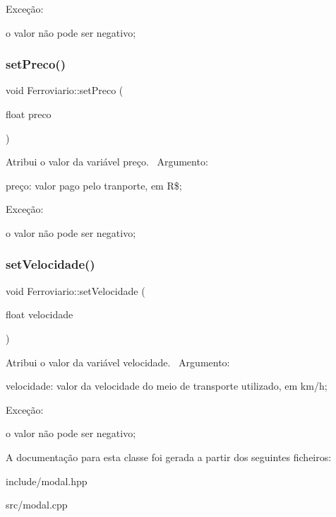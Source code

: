 Exceção\+:
\begin{DoxyItemize}
\item o valor não pode ser negativo;
\end{DoxyItemize}\mbox{\label{classFerroviario_a51c231a25084ce9bef1648642196b94e}} 
\subsubsection{\texorpdfstring{set\+Preco()}{setPreco()}}
{\footnotesize\ttfamily void Ferroviario\+::set\+Preco (\begin{DoxyParamCaption}\item[{float}]{preco }\end{DoxyParamCaption})}

Atribui o valor da variável preço.~\newline
 Argumento\+:
\begin{DoxyItemize}
\item preço\+: valor pago pelo tranporte, em R\$;
\end{DoxyItemize}

Exceção\+:
\begin{DoxyItemize}
\item o valor não pode ser negativo;
\end{DoxyItemize}\mbox{\label{classFerroviario_a773bb8838b8e651c5a59a196fd3df6be}} 
\subsubsection{\texorpdfstring{set\+Velocidade()}{setVelocidade()}}
{\footnotesize\ttfamily void Ferroviario\+::set\+Velocidade (\begin{DoxyParamCaption}\item[{float}]{velocidade }\end{DoxyParamCaption})}

Atribui o valor da variável velocidade.~\newline
 Argumento\+:
\begin{DoxyItemize}
\item velocidade\+: valor da velocidade do meio de transporte utilizado, em km/h;
\end{DoxyItemize}

Exceção\+:
\begin{DoxyItemize}
\item o valor não pode ser negativo;
\end{DoxyItemize}

A documentação para esta classe foi gerada a partir dos seguintes ficheiros\+:\begin{DoxyCompactItemize}
\item 
include/modal.\+hpp\item 
src/modal.\+cpp\end{DoxyCompactItemize}
